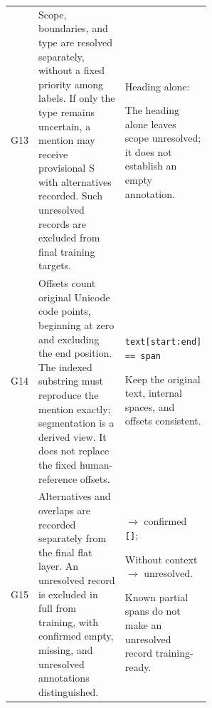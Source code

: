 \documentclass[fleqn,12pt]{wlpeerj}
\begin{document}
\begin{longtable}{@{}P{0.07\linewidth}P{0.49\linewidth}P{\linewidth-16pt\relax}@{}}
G13 & Scope, boundaries, and type are resolved separately, without a fixed priority among labels. If only the type remains uncertain, a mention may receive provisional S with alternatives recorded. Such unresolved records are excluded from final training targets. & Heading alone: \par\smallskip The heading alone leaves scope unresolved; it does not establish an empty annotation. \\[0pt]
G14 & Offsets count original Unicode code points, beginning at zero and excluding the end position. The indexed substring must reproduce the mention exactly; segmentation is a derived view. It does not replace the fixed human-reference offsets. & \texttt{text[start:end] == span}\par\smallskip Keep the original text, internal spaces, and offsets consistent. \\[0pt]
G15 & Alternatives and overlaps are recorded separately from the final flat layer. An unresolved record is excluded in full from training, with confirmed empty, missing, and unresolved annotations distinguished. & \par $\rightarrow$ confirmed \texttt{[]};\par\smallskip{}\par Without context $\rightarrow$ unresolved.\par\smallskip Known partial spans do not make an unresolved record training-ready. \\
\bottomrule
\end{longtable}


\endgroup
\end{document}
